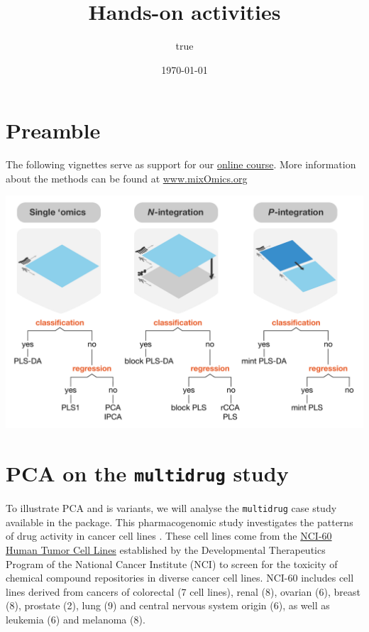 \documentclass[]{book}
\title{Hands-on activities}
\author{true}
\date{\today}
\begin{document}
\maketitle

{
\setcounter{tocdepth}{1}
\tableofcontents
}
\hypertarget{preamble}{%
\chapter*{Preamble}\label{preamble}}

The following vignettes serve as support for our \href{https://study.unimelb.edu.au/find/short-courses/mixomics-r-essentials-for-biological-data-integration/\#course-specifics}{online course}. More information about the methods can be found at \url{www.mixOmics.org}

\includegraphics{XtraFigs/MixOmicsAnalysesV2.pdf}



\hypertarget{pca-multidrug-case}{%
\chapter{\texorpdfstring{PCA on the \texttt{multidrug} study}{PCA on the multidrug study}}\label{pca-multidrug-case}}

To illustrate PCA and is variants, we will analyse the \texttt{multidrug} case study available in the package. This pharmacogenomic study investigates the patterns of drug activity in cancer cell lines \citep{Sza04}. These cell lines come from the \href{https://dtp.cancer.gov/discovery_development/nci-60/}{NCI-60 Human Tumor Cell Lines} established by the Developmental Therapeutics Program of the National Cancer Institute (NCI) to screen for the toxicity of chemical compound repositories in diverse cancer cell lines. NCI-60 includes cell lines derived from cancers of colorectal (7 cell lines), renal (8), ovarian (6), breast (8), prostate (2), lung (9) and central nervous system origin (6), as well as leukemia (6) and melanoma (8).
\end{document}
